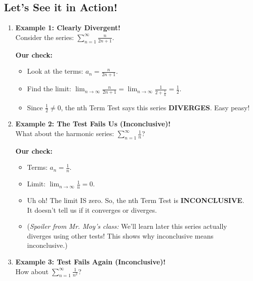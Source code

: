 \documentclass{article}
\begin{document}
\subsection*{Let's See it in Action!}

\begin{enumerate}[label=\textbf{\arabic*.},itemsep=15pt]

  \item \textbf{Example 1: Clearly Divergent!} \\
        Consider the series: \(\displaystyle\sum_{n=1}^{\infty} \frac{n}{2n+1}\).

        \textbf{Our check:}
        \begin{itemize}
            \item Look at the terms: \(a_n = \frac{n}{2n+1}\).
            \item Find the limit: \(\lim_{n\to\infty} \frac{n}{2n+1} = \lim_{n\to\infty} \frac{1}{2+\frac{1}{n}} = \frac{1}{2}\).
            \item Since \(\frac{1}{2} \neq 0\), the nth Term Test says this series \textbf{DIVERGES}. Easy peasy!
        \end{itemize}
        \vspace{10pt}

  \item \textbf{Example 2: The Test Fails Us (Inconclusive)!} \\
        What about the harmonic series: \(\displaystyle\sum_{n=1}^{\infty} \frac{1}{n}\)?

        \textbf{Our check:}
        \begin{itemize}
            \item Terms: \(a_n = \frac{1}{n}\).
            \item Limit: \(\lim_{n\to\infty} \frac{1}{n} = 0\).
            \item Uh oh! The limit IS zero. So, the nth Term Test is \textbf{INCONCLUSIVE}. It doesn't tell us if it converges or diverges.
            \item (\textit{Spoiler from Mr. Moy's class:} We'll learn later this series actually diverges using other tests! This shows why inconclusive means inconclusive.)
        \end{itemize}
        \vspace{10pt}

  \item \textbf{Example 3: Test Fails Again (Inconclusive)!} \\
        How about \(\displaystyle\sum_{n=1}^{\infty} \frac{1}{n^2}\)?


\end{enumerate}
\end{document}
